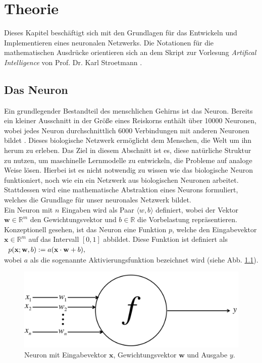 \chapter{Theorie}
Dieses Kapitel beschäftigt sich mit den Grundlagen für das Entwickeln und Implementieren eines neuronalen Netzwerks. Die Notationen für die mathematischen Ausdrücke orientieren sich an dem Skript zur Vorlesung \textit{Artifical Intelligence} von Prof. Dr. Karl Stroetmann \cite{stroetmann:2017}.

\section{Das Neuron}
\label{chap:sigmoid}
Ein grundlegender Bestandteil des menschlichen Gehirns ist das Neuron. Bereits ein kleiner Ausschnitt in der Größe eines Reiskorns enthält über 10000 Neuronen, wobei jedes Neuron durchschnittlich 6000 Verbindungen mit anderen Neuronen bildet \cite{buduma:2017}. Dieses biologische Netzwerk ermöglicht dem Menschen, die Welt um ihn herum zu erleben. Das Ziel in diesem Abschnitt ist es, diese natürliche Struktur zu nutzen, um maschinelle Lernmodelle zu entwickeln, die Probleme auf analoge Weise lösen. Hierbei ist es nicht notwendig zu wissen wie das biologische Neuron funktioniert, noch wie ein ein Netzwerk aus biologischen Neuronen arbeitet. Stattdessen wird eine mathematische Abstraktion eines Neurons formuliert, welches die Grundlage für unser neuronales Netzwerk bildet. \\
Ein Neuron mit $n$ Eingaben wird als Paar $\langle w,b \rangle$ definiert, wobei der Vektor $\mathbf{w} \in \mathbb{R}^m$ den Gewichtungsvektor und $b \in \mathbb{R}$ die Vorbelastung repräsentieren. Konzeptionell gesehen, ist das Neuron eine Funktion $p$, welche den Eingabevektor $\mathbf{x} \in \mathbb{R}^m$ auf das Intervall $[0,1]$ abbildet. Diese Funktion ist definiert als \\[0.2cm]
\hspace*{1.3cm}
$
\begin{array}[t]{lclll}
	p(\mathbf{x};\mathbf{w},b) := a(\mathbf{x}\cdot\mathbf{w}+b),
\end{array}
$
\\[0.2cm]
wobei $a$ als die sogenannte Aktivierungsfunktion bezeichnet wird (siehe Abb. \ref{fig:perceptron}).
\begin{figure}[hbt]
	\centering
	\includegraphics[scale=0.25]{Bilder/sigmoid_neuron}
	\caption{Neuron mit Eingabevektor $\mathbf{x}$, Gewichtungsvektor $\mathbf{w}$ und Ausgabe $y$. \cite{buduma:2017}} 
	\label{fig:perceptron} 
\end{figure}

